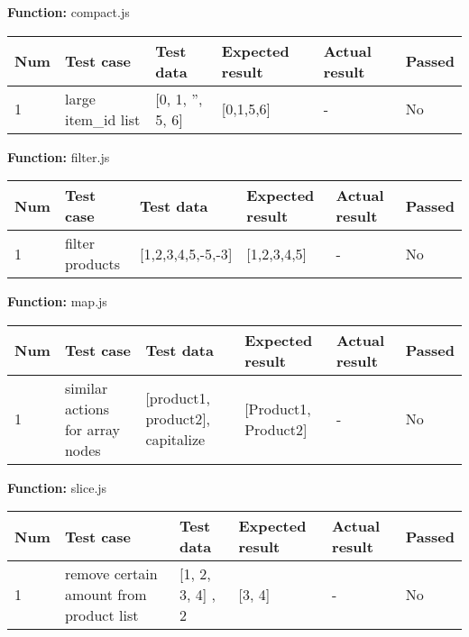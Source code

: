 \documentclass[a4paper, 12pt]{article}
\begin{document}
        \textbf{Function:} compact.js
        
        \begin{table}[h!]
            \begin{tabular}{|l|l|l|l|l|l|}
                \hline
                Num & Test case        					& Test data 					& Expected result 					& Actual result 		& Passed \\ \hline
                1   & large item\_id list 				& {[}0, 1, '', 5, 6{]}     		& {[}0,1,5,6{]}               		& -             		& No     \\ \hline
            \end{tabular}
        \end{table}
    
        \textbf{Function:} filter.js
        
        \begin{table}[h!]
            \begin{tabular}{|l|l|l|l|l|l|}
                \hline
                Num & Test case        					& Test data 					& Expected result 					& Actual result 		& Passed \\ \hline
                1   & filter products 					& {[}1,2,3,4,5,-5,-3{]}     	& {[}1,2,3,4,5{]}               	& -             		& No     \\ \hline
            \end{tabular}
        \end{table}
    
        \textbf{Function:} map.js
        
        \begin{table}[h!]
            \begin{tabular}{|l|l|l|l|l|l|}
                \hline
                Num & Test case        					& Test data 									& Expected result 					& Actual result 		& Passed \\ \hline
                1   & similar actions for array nodes 	& {[}product1, product2{]}, capitalize     		& {[}Product1, Product2{]}          & -             		& No     \\ \hline
            \end{tabular}
        \end{table}
    
        \textbf{Function:} slice.js
        
        \begin{table}[h!]
            \begin{tabular}{|l|l|l|l|l|l|}
                \hline
                Num & Test case        							& Test data 					& Expected result 					& Actual result 		& Passed \\ \hline
                1   & remove certain amount from product list 	& {[}1, 2, 3, 4{]} , 2     		& {[}3, 4{]}               			& -             		& No     \\ \hline
            \end{tabular}
        \end{table}
        
\end{document}
